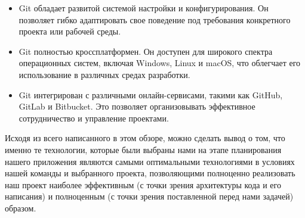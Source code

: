 \begin{itemize}
        \item Git обладает развитой системой настройки и конфигурирования. Он позволяет гибко адаптировать свое поведение под требования конкретного проекта или рабочей среды.
        \item Git полностью кроссплатформен. Он доступен для широкого спектра операционных систем, включая Windows, Linux и macOS, что облегчает его использование в различных средах разработки.
        \item Git интегрирован с различными онлайн-сервисами, такими как GitHub, GitLab и Bitbucket. Это позволяет организовывать эффективное сотрудничество и управление проектами.
    \end{itemize}

    Исходя из всего написанного в этом обзоре, можно сделать вывод о том, что именно те технологии, которые были выбраны нами на этапе планирования нашего приложения являются самыми оптимальными технологиями в условиях нашей команды и выбранного проекта, позволяющими  полноценно реализовать наш проект наиболее эффективным (с точки зрения архитектуры кода и его написания) и полноценным (с точки зрения поставленной перед нами задачей) образом.
\endinput